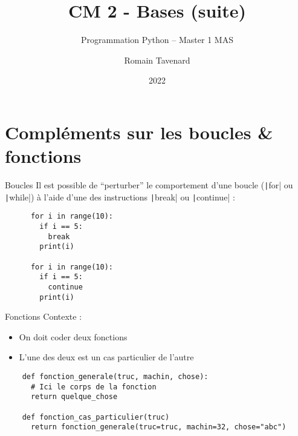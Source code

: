 \documentclass[10pt]{beamer}
\title[M1 MAS -- Python -- Bases (suite)]{CM 2 - Bases (suite)}
\subtitle{Programmation Python -- Master 1 MAS}
\author{Romain Tavenard}
\date{2022}
\institute{%
\hypersetup{urlcolor=.}
\makebox[2.2ex][c]{\faEnvelope}\enspace\href{mailto:romain.tavenard@univ-rennes2.fr}{\texttt{romain.tavenard@univ-rennes2.fr}}\\%
}
\begin{document}
\maketitle

\section{Compléments sur les boucles \& fonctions}

\begin{frame}[fragile]{Boucles}  
  Il est possible de ``perturber'' le comportement d'une boucle (\texttt|for| ou \texttt|while|) à l'aide d'une des instructions \texttt|break| ou \texttt|continue| :

  \begin{beamercodeblock}
    \begin{verbatim}
      for i in range(10):
        if i == 5:
          break
        print(i)
      
      for i in range(10):
        if i == 5:
          continue
        print(i)
    \end{verbatim}
  \end{beamercodeblock}
\end{frame}

\begin{frame}[fragile]{Fonctions}  
  Contexte :

  \begin{itemize}
    \item On doit coder deux fonctions
    \item L'une des deux est un cas particulier de l'autre
  \end{itemize}

  \begin{beamercodeblock}
    \begin{verbatim}
    def fonction_generale(truc, machin, chose):
      # Ici le corps de la fonction
      return quelque_chose
    
    def fonction_cas_particulier(truc)
      return fonction_generale(truc=truc, machin=32, chose="abc")
    \end{verbatim}
  \end{beamercodeblock}
\end{frame}
\end{document}
